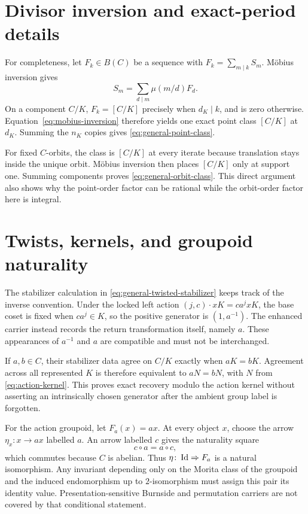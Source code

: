 \documentclass[11pt]{article}
\theoremstyle{definition}
\theoremstyle{remark}
\begin{document}
\appendix

\section{Divisor inversion and exact-period details}
\label{app:inversion}

For completeness, let \(F_k\in B(C)\) be a sequence with
\(F_k=\sum_{m\mid k}S_m\).  Möbius inversion gives
\begin{equation}
  S_m=\sum_{d\mid m}\mu(m/d)F_d.
  \label{eq:mobius-inversion}
\end{equation}
On a component \(C/K\), \(F_k=[C/K]\) precisely when \(d_K\mid k\), and is
zero otherwise.  Equation~\eqref{eq:mobius-inversion} therefore yields one
exact point class \([C/K]\) at \(d_K\).  Summing the \(n_K\) copies gives
\eqref{eq:general-point-class}.

For fixed \(C\)-orbits, the class is \([C/K]\) at every iterate because
translation stays inside the unique orbit.  Möbius inversion then places
\([C/K]\) only at support one.  Summing components proves
\eqref{eq:general-orbit-class}.  This direct argument also shows why the
point-order factor can be rational while the orbit-order factor here is
integral.

\section{Twists, kernels, and groupoid naturality}
\label{app:twists}

The stabilizer calculation in \eqref{eq:general-twisted-stabilizer} keeps
track of the inverse convention.  Under the locked left action
\((j,c)\cdot xK=ca^jxK\), the base coset is fixed when \(ca^j\in K\), so
the positive generator is \((1,a^{-1})\).  The enhanced carrier instead
records the return transformation itself, namely \(a\).  These appearances
of \(a^{-1}\) and \(a\) are compatible and must not be interchanged.

If \(a,b\in C\), their stabilizer data agree on \(C/K\) exactly when
\(aK=bK\).  Agreement across all represented \(K\) is therefore equivalent
to \(aN=bN\), with \(N\) from \eqref{eq:action-kernel}.  This proves exact
recovery modulo the action kernel without asserting an intrinsically chosen
generator after the ambient group label is forgotten.

For the action groupoid, let \(F_a(x)=ax\).  At every object \(x\), choose
the arrow \(\eta_x\colon x\to ax\) labelled \(a\).  An arrow labelled \(c\)
gives the naturality square
\[
  c\circ a=a\circ c,
\]
which commutes because \(C\) is abelian.  Thus
\(\eta\colon\operatorname{Id}\Rightarrow F_a\) is a natural isomorphism.  Any invariant
depending only on the Morita class of the groupoid and the induced
endomorphism up to \(2\)-isomorphism must assign this pair its identity
value.  Presentation-sensitive Burnside and permutation carriers are not
covered by that conditional statement.
\end{document}
